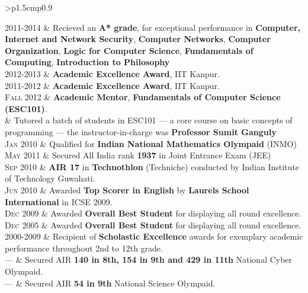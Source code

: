 \documentclass[a4paper,10pt]{article} %
\newcommand{\itemlist}[1]{
    \begin{tabular}{>{\raggedleft}p{1.5cm}p{0.9\linewidth}}
        #1
    \end{tabular}
}
\begin{document}
\itemlist {
    \textsc{2011-2014}   & Recieved an \textbf{A* grade}, for exceptional performance in
                            \textbf{Computer, Internet and Network Security},
                            \textbf{Computer Networks},
                            \textbf{Computer Organization},
                            \textbf{Logic for Computer Science},
                            \textbf{Fundamentals of Computing},
                            \textbf{Introduction to Philosophy} \\
    \textsc{2012-2013}   & \textbf{Academic Excellence Award}, IIT Kanpur. \\
    \textsc{2011-2012}   & \textbf{Academic Excellence Award}, IIT Kanpur. \\
    \textsc{Fall 2012}   & \textbf{Academic Mentor}, \textbf{Fundamentals of Computer Science (ESC101)}. \\
                         & \footnotesize{Tutored a batch of students in ESC101 --- a core course on
                            basic concepts of programming --- the instructor-in-charge was \textbf{Professor
                            Sumit Ganguly}}\\
    \textsc{Jan 2010}    & Qualified for \textbf{Indian National Mathematics Olympaid} (INMO) \\
    \textsc{May 2011}    & Secured All India rank \textbf{1937} in Joint Entrance Exam (JEE) \\
    \textsc{Sep 2010}    & \textbf{AIR 17} in \textbf{Technothlon} (Techniche) conducted by Indian Institute of Technology Guwahati. \\
    \textsc{Jun 2010}   & Awarded \textbf{Top Scorer in English} by \textbf{Laurels School International} in ICSE 2009. \\
    \textsc{Dec 2009}    & Awarded \textbf{Overall Best Student} for displaying all round excellence. \\
    \textsc{Dec 2005}    & Awarded \textbf{Overall Best Student} for displaying all round excellence. \\
    \textsc{2000-2009} & Recipient of \textbf{Scholastic Excellence} awards for exemplary academic
                           performance throughout 2nd to 12th grade. \\
    \textsc{---} & Secured AIR \textbf{140 in 8th, 154 in 9th and 429 in 11th} National Cyber Olympaid.\\
    \textsc{---} & Secured AIR \textbf{54 in 9th} National Science Olympaid.\\
}
\end{document}

